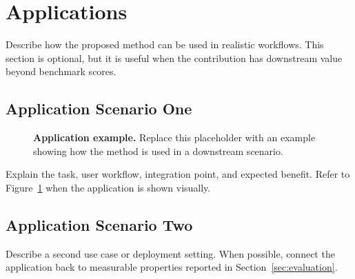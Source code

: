 \section{Applications}

Describe how the proposed method can be used in realistic workflows.
This section is optional, but it is useful when the contribution has downstream value beyond benchmark scores.

\subsection{Application Scenario One}

\begin{figure}[t]
    \centering
    \caption{\textbf{Application example.} Replace this placeholder with an example showing how the method is used in a downstream scenario.}
    \label{fig:application_example}
\end{figure}

Explain the task, user workflow, integration point, and expected benefit.
Refer to Figure~\ref{fig:application_example} when the application is shown visually.

\subsection{Application Scenario Two}

Describe a second use case or deployment setting.
When possible, connect the application back to measurable properties reported in Section~\ref{sec:evaluation}.
